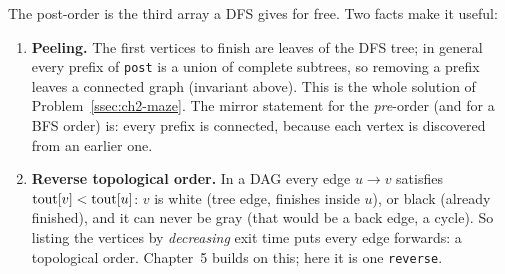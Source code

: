 The post-order is the third array a DFS gives for free. Two facts make it useful:
\begin{enumerate}[leftmargin=*]
    \item \textbf{Peeling.} The first vertices to finish are leaves of the DFS tree; in general every prefix of \texttt{post} is a union of complete subtrees, so removing a prefix leaves a connected graph (invariant above). This is the whole solution of Problem~\ref{ssec:ch2-maze}. The mirror statement for the \emph{pre}-order (and for a BFS order) is: every prefix is connected, because each vertex is discovered from an earlier one.
    \item \textbf{Reverse topological order.} In a DAG every edge $u \to v$ satisfies $\mathrm{tout}[v] < \mathrm{tout}[u]$: $v$ is white (tree edge, finishes inside $u$), or black (already finished), and it can never be gray (that would be a back edge, a cycle). So listing the vertices by \emph{decreasing} exit time puts every edge forwards: a topological order. Chapter~5 builds on this; here it is one \texttt{reverse}.
\end{enumerate}

